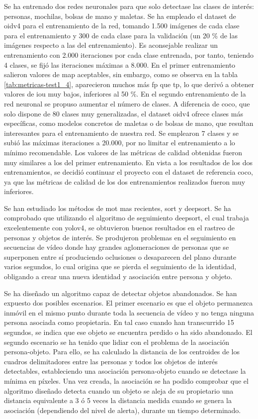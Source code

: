 Se ha entrenado dos redes neuronales para que solo detectase las clases de interés: personas, mochilas, bolsas de mano y maletas. Se ha empleado el dataset de \gls{oidv4} para el entrenamiento de la red, tomando 1.500 imágenes de cada clase para el entrenamiento y 300 de cada clase para la validación (un 20 \% de las imágenes respecto a las del entrenamiento). Es aconsejable realizar un entrenamiento con 2.000 iteraciones por cada clase entrenada, por tanto, teniendo 4 clases, se fijó las iteraciones máximas a 8.000. En el primer entrenamiento salieron valores de \gls{map} aceptables, sin embargo, como se observa en la tabla \ref{tab:metricas-test1_4}, aparecieron muchos más \gls{fp} que \gls{tp}, lo que derivó a obtener valores de \gls{iou} muy bajos, inferiores al 50 \%. En el segundo entrenamiento de la red neuronal se propuso aumentar el número de clases. A diferencia de \gls{coco}, que solo dispone de 80 clases muy generalizadas, el dataset \gls{oidv4} ofrece clases más específicas, como modelos concretos de maletas o de bolsas de mano, que resultan interesantes para el entrenamiento de nuestra red. Se emplearon 7 clases y se subió las máximas iteraciones a 20.000, por no limitar el entrenamiento a lo mínimo recomendable. Los valores de las métricas de calidad obtenidas fueron muy similares a los del primer entrenamiento. En vista a los resultados de los dos entrenamientos, se decidió continuar el proyecto con el dataset de referencia \gls{coco}, ya que las métricas de calidad de los dos entrenamientos realizados fueron muy inferiores.

Se han estudiado los métodos de \gls{mot} mas recientes, \gls{sort} y \gls{deepsort}. Se ha comprobado que utilizando el algoritmo de seguimiento \gls{deepsort}, el cual trabaja excelentemente con \gls{yolov4}, se obtuvieron buenos resultados en el rastreo de personas y objetos de interés. Se produjeron problemas en el seguimiento en secuencias de vídeo donde hay grandes aglomeraciones de personas que se superponen entre sí produciendo oclusiones o desaparecen del plano durante varios segundos, lo cual origina que se pierda el seguimiento de la identidad, obligando a crear una nueva identidad y asociación entre persona y objeto.

Se ha diseñado un algoritmo capaz de detectar objetos abandonados. Se han expuesto dos posibles escenarios. El primer escenario es que el objeto permanezca inmóvil en el mismo punto durante toda la secuencia de vídeo y no tenga ninguna persona asociada como propietaria. En tal caso cuando han transcurrido 15 segundos, se indica que ese objeto se encuentra perdido o ha sido abandonado. El segundo escenario se ha tenido que lidiar con el problema de la asociación persona-objeto. Para ello, se ha calculado la distancia de los centroides de los cuadros delimitadores entre las personas y todos los objetos de interés detectables, estableciendo una asociación persona-objeto cuando se detectase la mínima en píxeles. Una vez creada, la asociación se ha podido comprobar que el algoritmo diseñado detecta cuando un objeto se aleja de su propietario una distancia equivalente a 3 ó 5 veces la distancia medida cuando se genera la asociación (dependiendo del nivel de alerta), durante un tiempo determinado.

